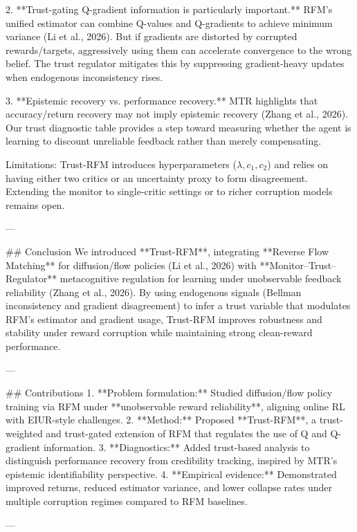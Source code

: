2. **Trust-gating Q-gradient information is particularly important.** RFM’s unified estimator can combine Q-values and Q-gradients to achieve minimum variance (Li et al., 2026). But if gradients are distorted by corrupted rewards/targets, aggressively using them can accelerate convergence to the wrong belief. The trust regulator mitigates this by suppressing gradient-heavy updates when endogenous inconsistency rises.

3. **Epistemic recovery vs. performance recovery.** MTR highlights that accuracy/return recovery may not imply epistemic recovery (Zhang et al., 2026). Our trust diagnostic table provides a step toward measuring whether the agent is learning to discount unreliable feedback rather than merely compensating.

Limitations: Trust-RFM introduces hyperparameters (\(\lambda, c_1, c_2\)) and relies on having either two critics or an uncertainty proxy to form disagreement. Extending the monitor to single-critic settings or to richer corruption models remains open.

---

## Conclusion  
We introduced **Trust-RFM**, integrating **Reverse Flow Matching** for diffusion/flow policies (Li et al., 2026) with **Monitor–Trust–Regulator** metacognitive regulation for learning under unobservable feedback reliability (Zhang et al., 2026). By using endogenous signals (Bellman inconsistency and gradient disagreement) to infer a trust variable that modulates RFM’s estimator and gradient usage, Trust-RFM improves robustness and stability under reward corruption while maintaining strong clean-reward performance.

---

## Contributions  
1. **Problem formulation:** Studied diffusion/flow policy training via RFM under **unobservable reward reliability**, aligning online RL with EIUR-style challenges.  
2. **Method:** Proposed **Trust-RFM**, a trust-weighted and trust-gated extension of RFM that regulates the use of Q and Q-gradient information.  
3. **Diagnostics:** Added trust-based analysis to distinguish performance recovery from credibility tracking, inspired by MTR’s epistemic identifiability perspective.  
4. **Empirical evidence:** Demonstrated improved returns, reduced estimator variance, and lower collapse rates under multiple corruption regimes compared to RFM baselines.

---